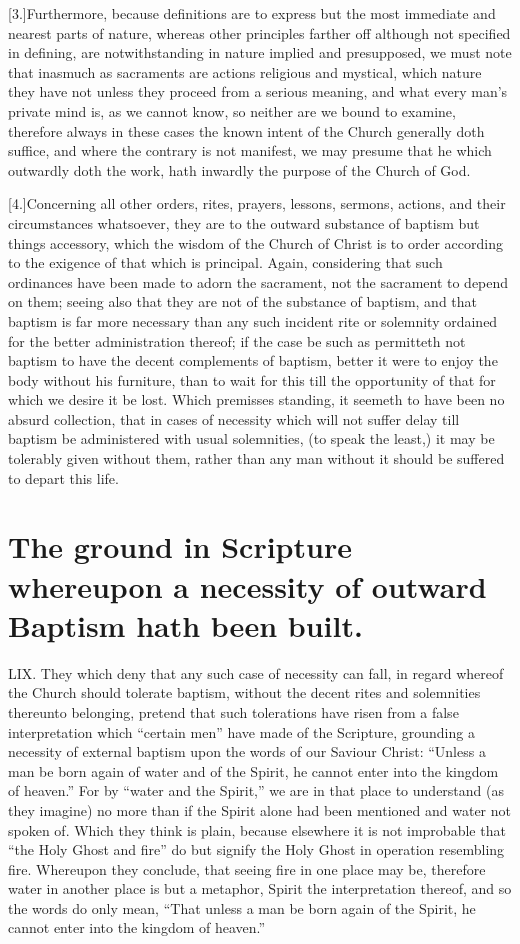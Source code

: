 [3.]Furthermore, because definitions are to express but the  most immediate and nearest parts of nature,
 whereas other principles farther off although not specified in defining, are notwithstanding in nature implied and presupposed, we must note that inasmuch as sacraments are actions religious and mystical, which nature they have not unless they proceed from a serious meaning, and what every man’s private mind is, as we cannot know, so neither are we bound to examine, therefore always in these cases the known intent of the Church generally doth suffice, and where the contrary is not manifest, we may presume that he which outwardly doth the work, hath inwardly the purpose of the Church of God.

[4.]Concerning all other orders, rites, prayers, lessons, sermons, actions, and their circumstances whatsoever, they are to the outward substance of baptism but things accessory, which the wisdom of the Church of Christ is to order according to  the exigence of that which is principal.
 Again, considering that such ordinances have been made to adorn the sacrament, not the sacrament to depend on them; seeing also that they are not of the substance of baptism, and that baptism is far more necessary than any such incident rite or solemnity ordained for the better administration thereof; if the case be such as permitteth not baptism to have the decent complements of baptism, better it were to enjoy the body without his furniture, than to wait for this till the opportunity of that for which we desire it be lost. Which premisses standing, it seemeth to have been no absurd collection, that in cases of necessity which will not suffer delay till baptism be administered with usual solemnities, (to speak the least,) it may be tolerably given without them, rather than any man without it should be suffered to depart this life.


\section*{The ground in Scripture whereupon a necessity of outward Baptism hath been built.}
LIX. They which deny that any such case of necessity can fall, in regard whereof the Church should tolerate baptism, without the decent rites and solemnities thereunto belonging, pretend that such tolerations have risen from a false interpretation which “certain men” have made of the Scripture, grounding a necessity of external baptism upon the words of our Saviour Christ: “Unless a man be born again of water and of the Spirit, he cannot enter into the kingdom of heaven.” For by “water and the Spirit,” we are in that  place to understand (as they imagine) no more than if the Spirit alone had been mentioned and water not spoken of.
 Which they think is plain, because elsewhere it is not improbable that “the Holy Ghost and fire” do but signify the Holy Ghost in operation resembling fire. Whereupon they conclude, that seeing fire in one place may be, therefore water in another place is but a metaphor, Spirit the interpretation thereof, and so the words do only mean, “That unless a man be born again of the Spirit, he cannot enter into the kingdom of heaven.”


